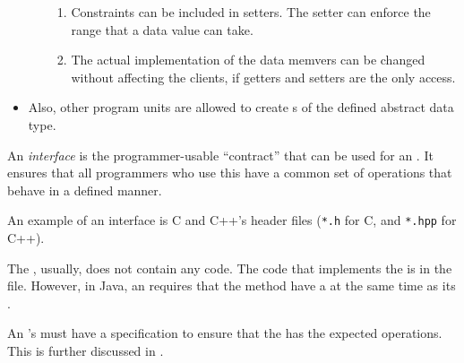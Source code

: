 \begin{definition}
\begin{itemize}[noitemsep]
\begin{itemize}[noitemsep]
\begin{enumerate}[noitemsep]
      \item Constraints can be included in setters. The setter can enforce the range that a data value can take.
      \item The actual implementation of the data memvers can be changed without affecting the clients, if getters and setters are the only access.
      \end{enumerate}
    \end{itemize}
  \item Also, other program units are allowed to create s of the defined abstract data type.
  \end{itemize}
\end{definition}

\begin{definition}[Interface]\label{def:ADT_Interface}
  An \emph{interface} is the programmer-usable ``contract'' that can be used for an .
  It ensures that all programmers who use this  have a common set of operations that behave in a defined manner.

  An example of an interface is C and C++'s header files (\texttt{*.h} for C, and \texttt{*.hpp} for C++).

  \begin{remark}
    The , usually, does not contain any code.
    The code that implements the  is in the  file.
    However, in Java, an  requires that the method have a  at the same time as its .
  \end{remark}

  \begin{remark}\label{rmk:ADT_Interface_Specification}
    An 's  must have a specification to ensure that the  has the expected operations.
    This is further discussed in .
  \end{remark}
\end{definition}


